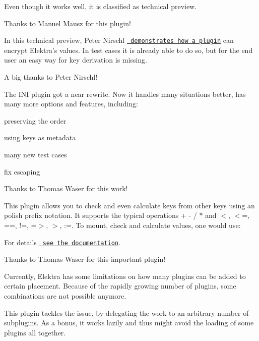 Even though it works well, it is classified as technical preview.

Thanks to Manuel Mausz for this plugin!

In this technical preview, Peter Nirschl \href{https://master.libelektra.org/src/plugins/crypto/}{\texttt{ demonstrates how a plugin}} can encrypt Elektra’s values. In test cases it is already able to do so, but for the end user an easy way for key derivation is missing.

A big thanks to Peter Nirschl!

The I\+NI plugin got a near rewrite. Now it handles many situations better, has many more options and features, including\+:


\begin{DoxyItemize}
\item preserving the order
\item using keys as metadata
\item many new test cases
\item fix escaping
\end{DoxyItemize}

Thanks to Thomas Waser for this work!

This plugin allows you to check and even calculate keys from other keys using an polish prefix notation. It supports the typical operations {\ttfamily + -\/ / $\ast$} and {\ttfamily $<$, $<$=, ==, !=, =$>$, $>$, \+:=}. To mount, check and calculate values, one would use\+:


\begin{DoxyCode}{0}
\end{DoxyCode}


For details \href{https://master.libelektra.org/src/plugins/mathcheck/}{\texttt{ see the documentation}}.

Thanks to Thomas Waser for this important plugin!

Currently, Elektra has some limitations on how many plugins can be added to certain placement. Because of the rapidly growing number of plugins, some combinations are not possible anymore.

This plugin tackles the issue, by delegating the work to an arbitrary number of subplugins. As a bonus, it works lazily and thus might avoid the loading of some plugins all together.

